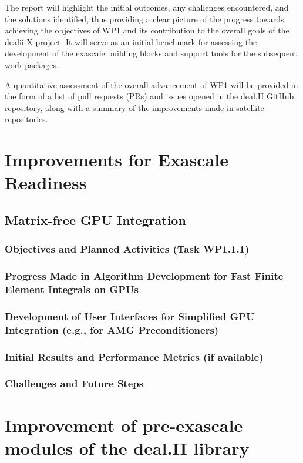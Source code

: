 \documentclass[a4paper,12pt]{article}
\begin{document}
The report will highlight the initial outcomes, any challenges encountered, and
the solutions identified, thus providing a clear picture of the progress towards
achieving the objectives of WP1 and its contribution to the overall goals of the
dealii-X project. It will serve as an initial benchmark for assessing the
development of the exascale building blocks and support tools for the subsequent
work packages.

A quantitative assessment of the overall advancement of WP1 will be provided in
the form of a list of pull requests (PRs) and issues opened in the deal.II
GitHub repository, along with a summary of the improvements made in satellite
repositories.

\section{Improvements for Exascale Readiness}    
    \subsection{Matrix-free GPU Integration}
        \subsubsection{Objectives and Planned Activities (Task WP1.1.1)}
        \subsubsection{Progress Made in Algorithm Development for Fast Finite Element Integrals on GPUs}
        \subsubsection{Development of User Interfaces for Simplified GPU Integration (e.g., for AMG Preconditioners)}
        \subsubsection{Initial Results and Performance Metrics (if available)}
        \subsubsection{Challenges and Future Steps}

\section{Improvement of pre-exascale modules of the deal.II library}
\end{document}
